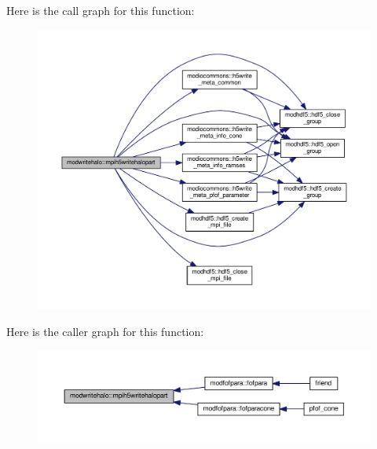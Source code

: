 Here is the call graph for this function\+:\nopagebreak
\begin{figure}[H]
\begin{center}
\leavevmode
\includegraphics[width=350pt]{namespacemodwritehalo_a7de4785bb81feb8a4b806bd18a65bf4d_cgraph}
\end{center}
\end{figure}




Here is the caller graph for this function\+:\nopagebreak
\begin{figure}[H]
\begin{center}
\leavevmode
\includegraphics[width=350pt]{namespacemodwritehalo_a7de4785bb81feb8a4b806bd18a65bf4d_icgraph}
\end{center}
\end{figure}


